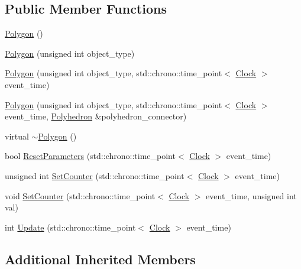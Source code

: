 \subsection*{Public Member Functions}
\begin{DoxyCompactItemize}
\item 
\hyperlink{class_polygon_ac183e712f8be1e13f1c9d5b4d4512ead}{Polygon} ()
\item 
\hyperlink{class_polygon_a023fe85caf3682e46fb6d15d03da3435}{Polygon} (unsigned int object\+\_\+type)
\item 
\hyperlink{class_polygon_aa2a7d4a8a7765c45b834a7ecc198e0c3}{Polygon} (unsigned int object\+\_\+type, std\+::chrono\+::time\+\_\+point$<$ \hyperlink{universe_8h_a0ef8d951d1ca5ab3cfaf7ab4c7a6fd80}{Clock} $>$ event\+\_\+time)
\item 
\hyperlink{class_polygon_a581ad88f80bf40668e6c8b928c908bcb}{Polygon} (unsigned int object\+\_\+type, std\+::chrono\+::time\+\_\+point$<$ \hyperlink{universe_8h_a0ef8d951d1ca5ab3cfaf7ab4c7a6fd80}{Clock} $>$ event\+\_\+time, \hyperlink{class_polyhedron}{Polyhedron} \&polyhedron\+\_\+connector)
\item 
virtual \hyperlink{class_polygon_a873f9acee059f717277b6414102dab16}{$\sim$\+Polygon} ()
\item 
bool \hyperlink{class_polygon_a0e2824d12cd6b18c8b14c64ef4b2bf97}{Reset\+Parameters} (std\+::chrono\+::time\+\_\+point$<$ \hyperlink{universe_8h_a0ef8d951d1ca5ab3cfaf7ab4c7a6fd80}{Clock} $>$ event\+\_\+time)
\item 
unsigned int \hyperlink{class_polygon_a344626b07ee8dc40c71c3bec1480d2c2}{Set\+Counter} (std\+::chrono\+::time\+\_\+point$<$ \hyperlink{universe_8h_a0ef8d951d1ca5ab3cfaf7ab4c7a6fd80}{Clock} $>$ event\+\_\+time)
\item 
void \hyperlink{class_polygon_ad12083d8c152a1979b04bead93b6b730}{Set\+Counter} (std\+::chrono\+::time\+\_\+point$<$ \hyperlink{universe_8h_a0ef8d951d1ca5ab3cfaf7ab4c7a6fd80}{Clock} $>$ event\+\_\+time, unsigned int val)
\item 
int \hyperlink{class_polygon_ab3fe58d8ffce2e16589958def88aa188}{Update} (std\+::chrono\+::time\+\_\+point$<$ \hyperlink{universe_8h_a0ef8d951d1ca5ab3cfaf7ab4c7a6fd80}{Clock} $>$ event\+\_\+time)
\end{DoxyCompactItemize}
\subsection*{Additional Inherited Members}


